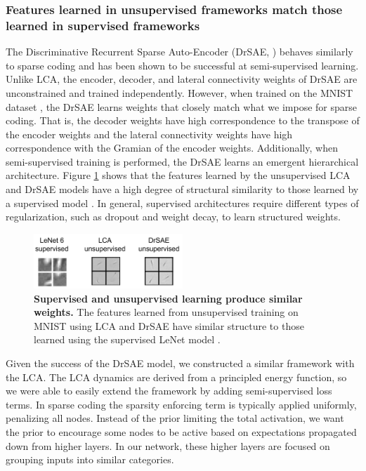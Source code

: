 \subsubsection{Features learned in unsupervised frameworks match those learned in supervised frameworks}
The Discriminative Recurrent Sparse Auto-Encoder (DrSAE, \cite{rolfe2013discriminative}) behaves similarly to sparse coding and has been shown to be successful at semi-supervised learning. Unlike LCA, the encoder, decoder, and lateral connectivity weights of DrSAE are unconstrained and trained independently. However, when trained on the MNIST dataset \parencite{lecun1998mnist}, the DrSAE learns weights that closely match what we impose for sparse coding. That is, the decoder weights have high correspondence to the transpose of the encoder weights and the lateral connectivity weights have high correspondence with the Gramian of the encoder weights. Additionally, when semi-supervised training is performed, the DrSAE learns an emergent hierarchical architecture. Figure \ref{fig:ch3_lenet_lca_drsae_weights} shows that the features learned by the unsupervised LCA and DrSAE models have a high degree of structural similarity to those learned by a supervised model \parencite{lecun1998gradient}. In general, supervised architectures require different types of regularization, such as dropout and weight decay, to learn structured weights.

\begin{figure}
    \centering
    \includegraphics[width=0.5\textwidth]{figures/lenet_lca_drsae_weights.png}
    \caption{\textbf{Supervised and unsupervised learning produce similar weights.} The features learned from unsupervised training on MNIST using LCA \parencite{rozell2008sparse} and DrSAE \parencite{rolfe2013discriminative} have similar structure to those learned using the supervised LeNet model \parencite{lecun1998gradient}.}
    \label{fig:ch3_lenet_lca_drsae_weights}
\end{figure}

Given the success of the DrSAE model, we constructed a similar framework with the LCA. The LCA dynamics are derived from a principled energy function, so we were able to easily extend the framework by adding semi-supervised loss terms. In sparse coding the sparsity enforcing term is typically applied uniformly, penalizing all nodes. Instead of the prior limiting the total activation, we want the prior to encourage some nodes to be active based on expectations propagated down from higher layers. In our network, these higher layers are focused on grouping inputs into similar categories.

